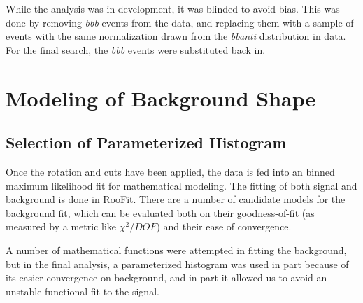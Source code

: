 While the analysis was in development, it was blinded to avoid bias.  This was done 
by removing \textit{bbb} events from the data, and replacing them with a sample of
events with the same normalization drawn from the \textit{bbanti} distribution
in data.  For the final search, the \textit{bbb} events were substituted back in.








\section{Modeling of Background Shape}
\subsection{Selection of Parameterized Histogram}
Once the rotation and cuts have been applied, the data is fed into an 
binned maximum likelihood fit for mathematical modeling.  The fitting
of both signal and background is done in RooFit.  There are a number 
of candidate models for the background fit, which can be evaluated
both on their goodness-of-fit (as measured by a metric like $\chi^2/DOF$)
and their ease of convergence.

A number of mathematical functions were attempted in fitting the
background, but in the final analysis, a parameterized histogram was
used in part because of its easier convergence on background, and
in part it allowed us to avoid an unstable functional fit to the signal.

